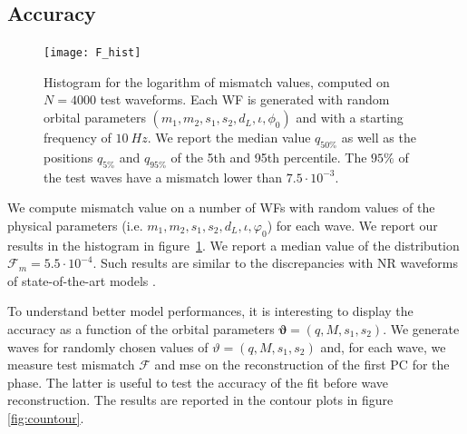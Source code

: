 \subsection{Accuracy}
\begin{figure}
	\centering
    \texttt{[image: F\_hist]}
	\caption{Histogram for the logarithm of mismatch values, computed on $N=4000$ test waveforms. Each WF is generated with random orbital parameters $(m_1,m_2, s_1, s_2, d_L, \iota, \phi_0)$ and with a starting frequency of $\SI{10}{Hz}$.
We report the median value $q_{50\%}$ as well as the positions $q_{5\%}$ and $q_{95\%}$ of the 5th and 95th percentile.
The $95\%$ of the test waves have a mismatch lower than $7.5 \cdot 10^{-3}$.
}
	\label{fig:F_hist}
\end{figure}
We compute mismatch value on a number of WFs with random values of the physical parameters (i.e. $m_1,m_2, s_1, s_2, d_L, \iota, \varphi_0$) for each wave.
We report our results in the histogram in figure~\ref{fig:F_hist}.
We report a median value of the distribution $\mathcal{F}_m = 5.5 \cdot {10^{-4}}$. Such results are similar to the discrepancies with NR waveforms of state-of-the-art models \cite{Bohe:2016gbl, Nagar:2018zoe, Nagar:2020pcj}.
\par
To understand better model performances, it is interesting to display the accuracy as a function of the orbital parameters $\boldsymbol{\vartheta} = (q,M,s_1,s_2)$.
We generate waves for randomly chosen values of $\vartheta = (q, M, s_1, s_2)$ and, for each wave, we measure test mismatch $\mathcal{F}$ and mse on the reconstruction of the first PC for the phase.
The latter is useful to test the accuracy of the fit before wave reconstruction.
The results are reported in the contour plots in figure \ref{fig:countour}.
\par

